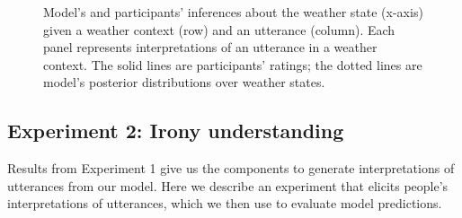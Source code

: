 \documentclass[10pt,letterpaper]{article}
\begin{document}

%

\begin{figure}[t]
\caption{Model's and participants' inferences about the weather state (x-axis) given a weather context (row) and an utterance (column). Each panel represents interpretations of an utterance in a weather context. The solid lines are participants' ratings; the dotted lines are model's posterior distributions over weather states.}
\label{model-state}
\end{figure}


\subsection{Experiment 2: Irony understanding}
Results from Experiment 1 give us the components to generate interpretations of utterances from our model. Here we describe an experiment that elicits people's interpretations of utterances, which we then use to evaluate model predictions. 
\end{document}
